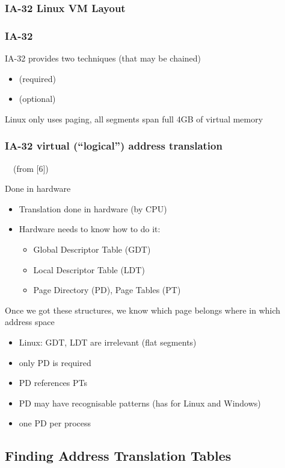 \documentclass{beamer}
\newenvironment{itemizeframe}[1]
  {\begin{frame}{#1}\startitemizeframe}
  {\stopitemizeframe\end{frame}}
\newcommand\startitemizeframe{\begin{itemize}}
\newcommand\stopitemizeframe{\end{itemize}}
\begin{document}
		\begin{frame} \frametitle{IA-32 Linux VM Layout}
		\end{frame}

		\begin{frame} \frametitle{IA-32}
			IA-32 provides two techniques (that may be chained)
			\begin{itemize}
				\item {} (required)
				\item {} (optional)
			\end{itemize}
			Linux only uses paging, all segments span full 4GB of virtual memory
		\end{frame}

		\begin{frame} \frametitle{IA-32 virtual (``logical'') address translation}
			 ~~(from [6])
		\end{frame}

		\begin{itemizeframe}{Done in hardware}
			\item Translation done in hardware (by CPU)
			\item Hardware needs to know how to do it:
			\begin{itemize}
				\item Global Descriptor Table (GDT)
				\item Local Descriptor Table (LDT)
				\item Page Directory (PD), Page Tables (PT)
			\end{itemize}
		\end{itemizeframe}

		\begin{frame}
			Once we got these structures,
			we know which page belongs where in which address space
			\begin{itemize}
				\item Linux: GDT, LDT are irrelevant (flat segments)
				\item only PD is required
				\item PD references PTs
				\item<2-> PD may have recognisable patterns (has for Linux and Windows)
				\item<2-> one PD per process
			\end{itemize}
		\end{frame}
	
	\subsection{Finding Address Translation Tables}
		
\end{document}
